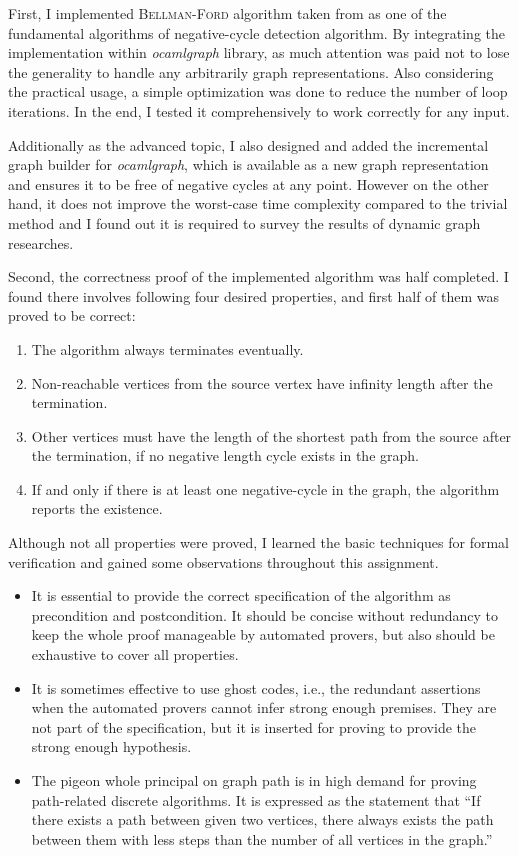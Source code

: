 \documentclass[a4paper,10.5pt]{article}
\begin{document}
First, I implemented \textsc{Bellman-Ford} algorithm taken from
\cite{cor01algo} as one of the fundamental algorithms of
negative-cycle detection algorithm. By integrating the implementation
within \emph{ocamlgraph} library, as much attention was paid not to
lose the generality to handle any arbitrarily graph
representations. Also considering the practical usage, a simple
optimization was done to reduce the number of loop iterations. In the
end, I tested it comprehensively to work correctly for any input.

Additionally as the advanced topic, I also designed and added the
incremental graph builder for \emph{ocamlgraph}, which is available as
a new graph representation and ensures it to be free of negative
cycles at any point. However on the other hand, it does not improve
the worst-case time complexity compared to the trivial method and I
found out it is required to survey the results of dynamic graph
researches.

Second, the correctness proof of the implemented algorithm was half
completed. I found there involves following four desired properties,
and first half of them was proved to be correct:

\begin{enumerate}\itemsep-3pt
\item The algorithm always terminates eventually.
\item Non-reachable vertices from the source vertex have infinity
  length after the termination.
\item Other vertices must have the length of the shortest path from
  the source after the termination, if no negative length cycle exists
  in the graph.
\item If and only if there is at least one negative-cycle in the
  graph, the algorithm reports the existence.
\end{enumerate}

Although not all properties were proved, I learned the basic
techniques for formal verification and gained some observations
throughout this assignment.

\begin{itemize}\itemsep-3pt
\item It is essential to provide the correct specification of the
  algorithm as precondition and postcondition. It should be concise
  without redundancy to keep the whole proof manageable by automated
  provers, but also should be exhaustive to cover all properties.
\item It is sometimes effective to use ghost codes, i.e., the
  redundant assertions when the automated provers cannot infer strong
  enough premises. They are not part of the specification, but it is
  inserted for proving to provide the strong enough hypothesis.
\item The pigeon whole principal on graph path is in high demand for
  proving path-related discrete algorithms. It is expressed as the
  statement that ``If there exists a path between given two vertices,
  there always exists the path between them with less steps than the
  number of all vertices in the graph.''
\end{itemize}
\end{document}
